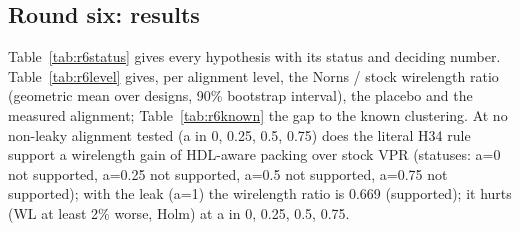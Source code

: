 
\subsection{Round six: results}
\label{sec:r6-results}
Table~\ref{tab:r6status} gives every hypothesis with its status and deciding number. Table~\ref{tab:r6level} gives, per alignment level, the Norns / stock wirelength ratio (geometric mean over designs, 90\% bootstrap interval), the placebo and the measured alignment; Table~\ref{tab:r6known} the gap to the known clustering. At no non-leaky alignment tested (a in {0, 0.25, 0.5, 0.75}) does the literal H34 rule support a wirelength gain of HDL-aware packing over stock VPR (statuses: a=0 not supported, a=0.25 not supported, a=0.5 not supported, a=0.75 not supported); with the leak (a=1) the wirelength ratio is 0.669 (supported); it hurts (WL at least 2\% worse, Holm) at a in {0, 0.25, 0.5, 0.75}.
